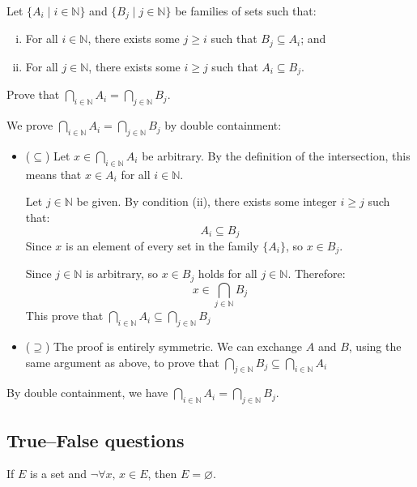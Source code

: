 \begin{chapex}
Let $\{ A_i \mid i \in \mathbb{N} \}$ and $\{ B_j \mid j \in \mathbb{N} \}$ be families of sets such that:
\begin{enumerate}[(i)]
\item For all $i \in \mathbb{N}$, there exists some $j \ge i$ such that $B_j \subseteq A_i$; and
\item For all $j \in \mathbb{N}$, there exists some $i \ge j$ such that $A_i \subseteq B_j$.
\end{enumerate}
Prove that $\bigcap_{i \in \mathbb{N}} A_i = \bigcap_{j \in \mathbb{N}} B_j$.
\end{chapex}

\begin{myproof}
    We prove $\bigcap_{i \in \mathbb{N}} A_i = \bigcap_{j \in \mathbb{N}} B_j$ by double containment:
    \begin{itemize}
        \item ($\subseteq$) Let $x \in \bigcap_{i \in \mathbb{N}} A_i$ be arbitrary. By the definition of the intersection, this means that $x \in A_i$ for all $i \in \mathbb{N}$.
        
        Let $j \in \mathbb{N}$ be given. By condition (ii), there exists some integer $i \ge j$ such that:
        \[A_i \subseteq B_j\]
        Since $x$ is an element of every set in the family $\{A_i\}$, so $x \in B_j$.

        Since $j \in \mathbb{N}$ is arbitrary, so $x \in B_j$ holds for all $j \in \mathbb{N}$. Therefore:
        \[x \in \bigcap_{j \in \mathbb{N}} B_j\]
        This prove that $\bigcap_{i \in \mathbb{N}} A_i \subseteq \bigcap_{j \in \mathbb{N}} B_j$
        \item ($\supseteq$) The proof is entirely symmetric. We can exchange $A$ and $B$, using the same argument as above, to prove that
        $\bigcap_{j \in \mathbb{N}} B_j \subseteq \bigcap_{i \in \mathbb{N}} A_i$
    \end{itemize}
    By double containment, we have $\bigcap_{i \in \mathbb{N}} A_i = \bigcap_{j \in \mathbb{N}} B_j$.
\end{myproof}

\subsection*{True--False questions}


\begin{chapex}
\label{cqSetsTFBegin}
If $E$ is a set and $\neg \forall x,\, x \in E$, then $E = \varnothing$. 
\end{chapex}

